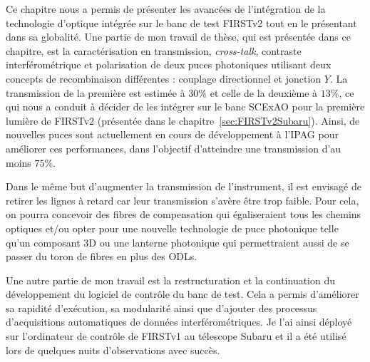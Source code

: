 Ce chapitre nous a permis de présenter les avancées de l'intégration de la technologie d'optique intégrée sur le banc de test \ac{FIRSTv2} tout en le présentant dans sa globalité. Une partie de mon travail de thèse, qui est présentée dans ce chapitre, est la caractérisation en transmission, \textit{cross-talk}, contraste interférométrique et polarisation de deux puces photoniques utilisant deux concepts de recombinaison différentes : couplage directionnel et jonction $Y$. La transmission de la première est estimée à $30\%$ et celle de la deuxième à $13\%$, ce qui nous a conduit à décider de les intégrer sur le banc \ac{SCExAO} pour la première lumière de \ac{FIRSTv2} (présentée dans le chapitre~\ref{sec:FIRSTv2Subaru}). Ainsi, de nouvelles puces sont actuellement en cours de développement à l'\ac{IPAG} pour améliorer ces performances, dans l'objectif d'atteindre une transmission d'au moins $75\%$.

Dans le même but d'augmenter la transmission de l'instrument, il est envisagé de retirer les lignes à retard car leur transmission s'avère être trop faible. Pour cela, on pourra concevoir des fibres de compensation qui égaliseraient tous les chemins optiques et/ou opter pour une nouvelle technologie de puce photonique telle qu'un composant 3D ou une lanterne photonique qui permettraient aussi de se passer du toron de fibres en plus des \ac{ODL}s.

Une autre partie de mon travail est la restructuration et la continuation du développement du logiciel de contrôle du banc de test. Cela a permis d'améliorer sa rapidité d'exécution, sa modularité ainsi que d'ajouter des processus d'acquisitions automatiques de données interférométriques. Je l'ai ainsi déployé sur l'ordinateur de contrôle de \ac{FIRSTv1} au télescope Subaru et il a été utilisé lors de quelques nuits d'observations avec succès.
